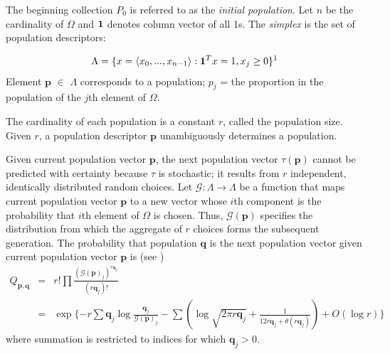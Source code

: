 The beginning collection $P_0$ is referred to as the {\em initial population}. Let $n$ be the cardinality 
of $\Omega$ and ${\bf1}$ denotes column vector of all 1s. The {\em simplex} is the set of population descriptors:

\[
\Lambda = \{x = \langle x_0,...,x_{n-1} \rangle: {\bf1}^T x=1, x_j \geq 0 \} \text{\footnotemark\label{fnm:1}}
\]
Element $\bm{p}$ $\in$ $\Lambda$ corresponds to a population;
$p_j$ = the proportion in the population of the $j$th element of $\Omega$.

The cardinality of each population is a constant $r$, called the population size. 
Given $r$, a population descriptor $\bm{p}$ unambiguously determines a population.

Given current population vector $\bm{p}$, the next population vector $\tau(\bm{p})$ cannot 
be predicted with certainty because $\tau$ is stochastic; it results from $r$ independent, identically distributed random choices. 
Let $\mathcal{G}:\Lambda \rightarrow \Lambda$ be a function that maps 
current population vector $\bm{p}$ to a new vector whose $i$th component 
is the probability that $i$th element of $\Omega$ is chosen. Thus, $\mathcal{G}(\bm{p})$ 
specifies the distribution from which the aggregate 
of $r$ choices forms the subsequent generation. The probability that population $\bm{q}$ is 
the next population vector given current population vector $\bm{p}$ is (see \cite{Vose1999}) 
\begin{eqnarray}
\label{Qmat}
Q_{\bm{p},\bm{q}} & = & r! \prod \frac{(\mathcal{G}(\bm{p})_j)^{r\bm{q}_j}}{(r\bm{q}_j)!} \\
 & = & \exp\{-r \sum \bm{q}_j \log \frac{\bm{q}_j}{\mathcal{G}(\bm{p})_j} - \sum (\log \sqrt{2 \pi r\bm{q}_j} + \frac{1}{12r\bm{q}_j + \theta (r\bm{q}_j)}) + O(\log r)\}
\end{eqnarray}
where summation is restricted to indices for which $\bm{q}_j > 0$.

